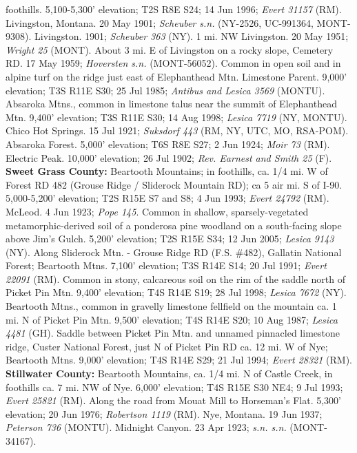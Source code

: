 foothills. 5,100-5,300' elevation; T2S R8E S24; 14 Jun 1996;
\textit{Evert 31157} (RM).
Livingston, Montana. 20 May 1901; \textit{Scheuber s.n.}
(NY-2526, UC-991364, MONT-9308).
Livingston. 1901; \textit{Scheuber 363} (NY).
1 mi. NW Livingston. 20 May 1951; \textit{Wright 25} (MONT).
About 3 mi. E of Livingston on a rocky slope, Cemetery RD. 17 May 1959;
\textit{Hoversten s.n.} (MONT-56052).
Common in open soil and in alpine turf on the ridge just east of Elephanthead
Mtn. Limestone Parent. 9,000' elevation; T3S R11E S30; 25 Jul 1985;
\textit{Antibus and Lesica 3569} (MONTU).
Absaroka Mtns., common in limestone talus near the summit of Elephanthead Mtn.
9,400' elevation; T3S R11E S30; 14 Aug 1998; \textit{Lesica 7719} (NY, MONTU).
Chico Hot Springs. 15 Jul 1921;
\textit{Suksdorf 443} (RM, NY, UTC, MO, RSA-POM).
Absaroka Forest. 5,000' elevation; T6S R8E S27; 2 Jun 1924;
\textit{Moir 73} (RM).
Electric Peak. 10,000' elevation; 26 Jul 1902;
\textit{Rev. Earnest and Smith 25} (F).
  \textbf{Sweet Grass County:}
Beartooth Mountains; in foothills, ca. 1/4 mi. W of Forest RD 482
(Grouse Ridge / Sliderock Mountain RD); ca 5 air mi. S of I-90. 5,000-5,200'
elevation; T2S R15E S7 and S8; 4 Jun 1993; \textit{Evert 24792} (RM).
McLeod. 4 Jun 1923; \textit{Pope 145}.
Common in shallow, sparsely-vegetated metamorphic-derived soil of a ponderosa
pine woodland on a south-facing slope above Jim's Gulch. 5,200' elevation;
T2S R15E S34; 12 Jun 2005; \textit{Lesica 9143} (NY).
Along Sliderock Mtn. - Grouse Ridge RD (F.S. \#482), Gallatin National Forest;
Beartooth Mtns. 7,100' elevation; T3S R14E S14; 20 Jul 1991;
\textit{Evert 22091} (RM).
Common in stony, calcareous soil on the rim of the saddle north of Picket Pin
Mtn. 9,400' elevation; T4S R14E S19; 28 Jul 1998; \textit{Lesica 7672} (NY).
Beartooth Mtns., common in gravelly limestone fellfield on the mountain ca.
1 mi. N of Picket Pin Mtn. 9,500' elevation; T4S R14E S20; 10 Aug 1987;
\textit{Lesica 4481} (GH).
Saddle between Picket Pin Mtn. and unnamed pinnacled limestone ridge,
Custer National Forest, just N of Picket Pin RD ca. 12 mi. W of Nye; Beartooth
Mtns. 9,000' elevation; T4S R14E S29; 21 Jul 1994; \textit{Evert 28321} (RM).
  \textbf{Stillwater County:}
Beartooth Mountains, ca. 1/4 mi. N of Castle Creek, in foothills ca. 7 mi. NW
of Nye. 6,000' elevation; T4S R15E S30 NE4; 9 Jul 1993;
\textit{Evert 25821} (RM).
Along the road from Mouat Mill to Horseman’s Flat. 5,300' elevation;
20 Jun 1976; \textit{Robertson 1119} (RM).
Nye, Montana. 19 Jun 1937; \textit{Peterson 736} (MONTU).
Midnight Canyon. 23 Apr 1923; \textit{s.n. s.n.} (MONT-34167).
